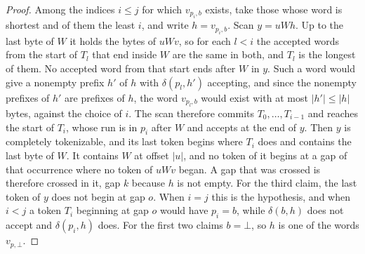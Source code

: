 \documentclass[11pt,a4paper]{article}
\theoremstyle{definition}
\theoremstyle{plain}
\begin{document}
\begin{proof}
Among the indices $i \leq j$ for which $v_{p_i, b}$ exists, take those whose word is shortest and of them the least $i$,
and write $h = v_{p_i, b}$. Scan $y = u W h$. Up to the last byte of $W$ it holds the bytes of $u W v$, so for each
$l < i$ the accepted words from the start of $T_l$ that end inside $W$ are the same in both, and $T_l$ is the longest of
them. No accepted word from that start ends after $W$ in $y$. Such a word would give a nonempty prefix $h'$ of $h$ with
$\delta(p_l, h')$ accepting, and since the nonempty prefixes of $h'$ are prefixes of $h$, the word $v_{p_l, b}$ would
exist with at most $|h'| \leq |h|$ bytes, against the choice of $i$. The scan therefore commits $T_0, \ldots, T_{i-1}$
and reaches the start of $T_i$, whose run is in $p_i$ after $W$ and accepts at the end of $y$. Then $y$ is completely
tokenizable, and its last token begins where $T_i$ does and contains the last byte of $W$. It contains $W$ at offset
$|u|$, and no token of it begins at a gap of that occurrence where no token of $u W v$ began. A gap that was crossed is
therefore crossed in it, gap $k$ because $h$ is not empty. For the third claim, the last token of $y$ does not begin at
gap $o$. When $i = j$ this is the hypothesis, and when $i < j$ a token $T_i$ beginning at gap $o$ would have $p_i = b$,
while $\delta(b, h)$ does not accept and $\delta(p_i, h)$ does. For the first two claims $b = \bot$, so $h$ is one of
the words $v_{p,\bot}$.
\end{proof}
\end{document}
